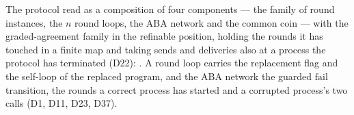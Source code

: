 \begin{definition}
  \label{def:aba-composed}
  \leanok
  The protocol read as a composition of four components --- the family of round instances, the $n$ round loops, the ABA network and the common coin --- with the graded-agreement family in the refinable position, holding the rounds it has touched in a finite map and taking sends and deliveries also at a process the protocol has terminated (D22): .
  A round loop carries the replacement flag and the self-loop  of the replaced program, and the ABA network the guarded $\mathrm{fail}$ transition, the rounds a correct process has started and a corrupted process's two calls (D1, D11, D23, D37).
\end{definition}
